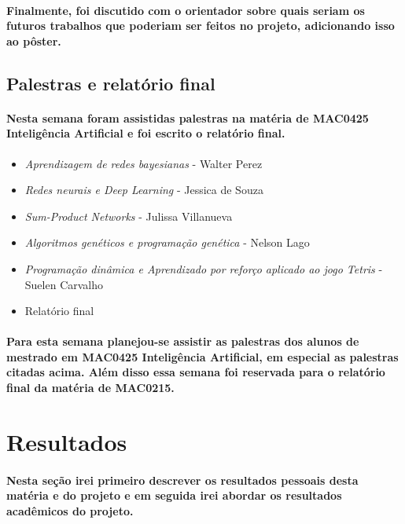 \documentclass[a4paper,10pt]{article}
\theoremstyle{plain}
\begin{document}
\paragraph{
  Finalmente, foi discutido com o orientador sobre quais seriam os futuros trabalhos que poderiam
  ser feitos no projeto, adicionando isso ao pôster.
}

\subsection{Palestras e relatório final}

\paragraph{
  Nesta semana foram assistidas palestras na matéria de MAC0425 Inteligência Artificial e foi
  escrito o relatório final.
}

\begin{itemize}
  \item \textit{Aprendizagem de redes bayesianas} - Walter Perez
  \item \textit{Redes neurais e Deep Learning} - Jessica de Souza
  \item \textit{Sum-Product Networks} - Julissa Villanueva
  \item \textit{Algoritmos genéticos e programação genética} - Nelson Lago
  \item \textit{Programação dinâmica e Aprendizado por reforço aplicado ao jogo Tetris} - Suelen
    Carvalho
  \item Relatório final
\end{itemize}

\paragraph{
  Para esta semana planejou-se assistir as palestras dos alunos de mestrado em MAC0425 Inteligência
  Artificial, em especial as palestras citadas acima. Além disso essa semana foi reservada para o
  relatório final da matéria de MAC0215.
}

\section{Resultados}

\paragraph{
  Nesta seção irei primeiro descrever os resultados pessoais desta matéria e do projeto e em
  seguida irei abordar os resultados acadêmicos do projeto.
}
\end{document}
